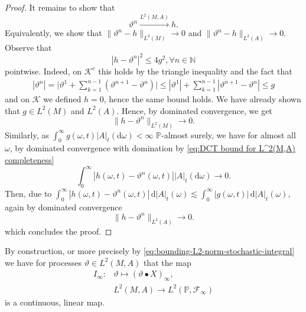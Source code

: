 \documentclass[11pt,a4paper,twoside,openany]{report}
\numberwithin{equation}{section}
\newcommand{\diff}{\mathrm{d}}
\theoremstyle{plain} %
\theoremstyle{definition} %
\theoremstyle{remark} %
\begin{document}
\begin{proof}
It remains to show that 
\begin{equation*}
    \vartheta^n\overset{L^2(M,A)}{\to}h.
\end{equation*}
Equivalently, we show that \(\lVert\vartheta^n-h\rVert_{L^2(M)}\to 0\) and \(\lVert\vartheta^n-h\rVert_{L^2(A)}\to 0\). Observe that
\begin{equation}\label{eq:DCT bound for L^2(M,A) completeness}
    |h-\vartheta^n|^2\leq 4g^2, \forall n\in\mathbb{N}
\end{equation}
pointwise. Indeed, on \(\mathcal{K}^c\) this holds by the triangle inequality and the fact that
\begin{align*}
    |\vartheta^n|=\bigg|\vartheta^1+\sum_{k=1}^{n-1}(\vartheta^{n+1}-\vartheta^n)\bigg|\leq |\vartheta^1|+\sum_{k=1}^{n-1}|\vartheta^{n+1}-\vartheta^n|\leq g
\end{align*}
and on \(\mathcal{K}\) we defined \(h=0\), hence the same bound holds.
We have already shown that \(g\in L^2(M)\) and \(L^2(A)\). Hence, by dominated convergence, we get 
\begin{equation*}
    \lVert h-\vartheta^n\rVert_{L^2(M)}\to 0.
\end{equation*}
Similarly, as \(\int_0^{\infty}g(\omega,t)|A|_t(\diff\omega)<\infty\) \(\mathbb{P}\)-almost surely, we have for almost all \(\omega\), by dominated convergence with domination by \eqref{eq:DCT bound for L^2(M,A) completeness}
\begin{equation*}
    \int_0^{\infty}|h(\omega,t)-\vartheta^n(\omega,t)||A|_t(\diff\omega)\to 0.
\end{equation*}
Then, due to \(\int_0^{\infty}|h(\omega,t)-\vartheta^n(\omega,t)|\,\diff|A|_t(\omega)\lesssim\int_0^{\infty}|g(\omega,t)|\,\diff|A|_t(\omega)\), again by dominated convergence
\begin{equation*}
     \lVert h-\vartheta^n\rVert_{L^2(A)}\to 0.
\end{equation*}
which concludes the proof.
\end{proof}

 By construction, or more precisely by \eqref{eq:bounding-L2-norm-stochastic-integral} we have for processes \(\vartheta\in L^2(M,A)\) that the map
 \begin{align*}\label{eq:final integral map}
    I_{\infty}:&\vartheta\mapsto (\vartheta\bullet X)_{\infty},
     \\&L^2(M,A)\to L^2(\mathbb{P},\mathcal{F}_{\infty})
 \end{align*} is a continuous, linear map.
\end{document}

